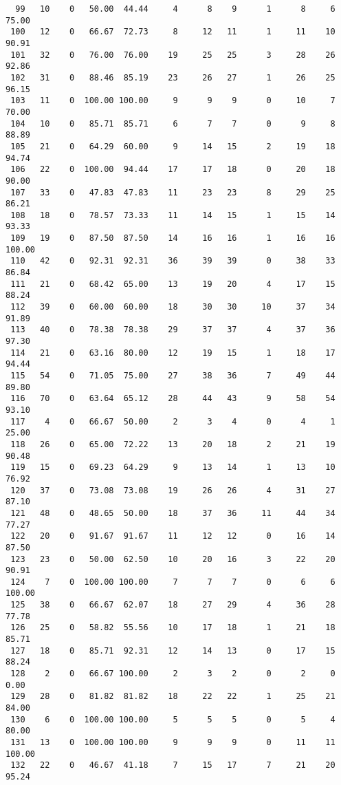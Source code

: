\begin{verbatim}
  99   10    0   50.00  44.44     4      8    9      1      8     6    75.00
 100   12    0   66.67  72.73     8     12   11      1     11    10    90.91
 101   32    0   76.00  76.00    19     25   25      3     28    26    92.86
 102   31    0   88.46  85.19    23     26   27      1     26    25    96.15
 103   11    0  100.00 100.00     9      9    9      0     10     7    70.00
 104   10    0   85.71  85.71     6      7    7      0      9     8    88.89
 105   21    0   64.29  60.00     9     14   15      2     19    18    94.74
 106   22    0  100.00  94.44    17     17   18      0     20    18    90.00
 107   33    0   47.83  47.83    11     23   23      8     29    25    86.21
 108   18    0   78.57  73.33    11     14   15      1     15    14    93.33
 109   19    0   87.50  87.50    14     16   16      1     16    16   100.00
 110   42    0   92.31  92.31    36     39   39      0     38    33    86.84
 111   21    0   68.42  65.00    13     19   20      4     17    15    88.24
 112   39    0   60.00  60.00    18     30   30     10     37    34    91.89
 113   40    0   78.38  78.38    29     37   37      4     37    36    97.30
 114   21    0   63.16  80.00    12     19   15      1     18    17    94.44
 115   54    0   71.05  75.00    27     38   36      7     49    44    89.80
 116   70    0   63.64  65.12    28     44   43      9     58    54    93.10
 117    4    0   66.67  50.00     2      3    4      0      4     1    25.00
 118   26    0   65.00  72.22    13     20   18      2     21    19    90.48
 119   15    0   69.23  64.29     9     13   14      1     13    10    76.92
 120   37    0   73.08  73.08    19     26   26      4     31    27    87.10
 121   48    0   48.65  50.00    18     37   36     11     44    34    77.27
 122   20    0   91.67  91.67    11     12   12      0     16    14    87.50
 123   23    0   50.00  62.50    10     20   16      3     22    20    90.91
 124    7    0  100.00 100.00     7      7    7      0      6     6   100.00
 125   38    0   66.67  62.07    18     27   29      4     36    28    77.78
 126   25    0   58.82  55.56    10     17   18      1     21    18    85.71
 127   18    0   85.71  92.31    12     14   13      0     17    15    88.24
 128    2    0   66.67 100.00     2      3    2      0      2     0     0.00
 129   28    0   81.82  81.82    18     22   22      1     25    21    84.00
 130    6    0  100.00 100.00     5      5    5      0      5     4    80.00
 131   13    0  100.00 100.00     9      9    9      0     11    11   100.00
 132   22    0   46.67  41.18     7     15   17      7     21    20    95.24

\end{verbatim}
